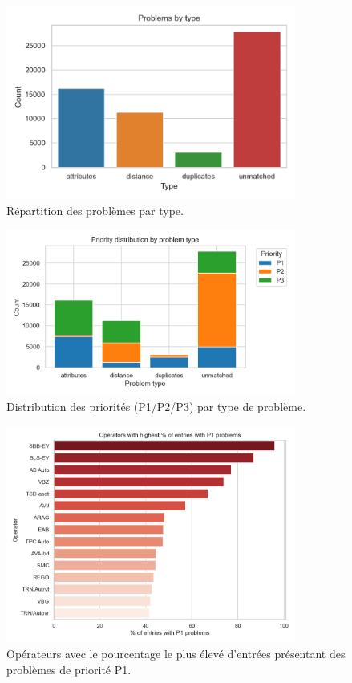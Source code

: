 \begin{figure}[H]
  \centering
  \includegraphics[width=0.85\textwidth]{../figures/chap6/problems_by_type.png}
  \caption{Répartition des problèmes par type.}
\end{figure}

\begin{figure}[H]
  \centering
  \includegraphics[width=0.85\textwidth]{../figures/chap6/priority_by_type.png}
  \caption{Distribution des priorités (P1/P2/P3) par type de problème.}
\end{figure}


\begin{figure}[H]
  \centering
  \includegraphics[width=0.85\textwidth]{../figures/chap6/operators_p1_percentage.png}
  \caption{Opérateurs avec le pourcentage le plus élevé d'entrées présentant des problèmes de priorité P1.}
\end{figure}
